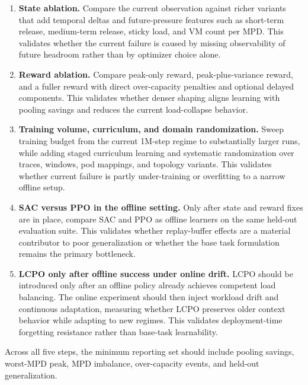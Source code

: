 \documentclass[11pt]{article}
\theoremstyle{definition}
\begin{document}
\begin{enumerate}[leftmargin=*]
    \item \textbf{State ablation.} Compare the current observation against richer
    variants that add temporal deltas and future-pressure features such as
    short-term release, medium-term release, sticky load, and VM count per MPD.
    This validates whether the current failure is caused by missing observability
    of future headroom rather than by optimizer choice alone.

    \item \textbf{Reward ablation.} Compare peak-only reward, peak-plus-variance
    reward, and a fuller reward with direct over-capacity penalties and optional
    delayed components. This validates whether denser shaping aligns learning with
    pooling savings and reduces the current load-collapse behavior.

    \item \textbf{Training volume, curriculum, and domain randomization.} Sweep
    training budget from the current 1M-step regime to substantially larger runs,
    while adding staged curriculum learning and systematic randomization over
    traces, windows, pod mappings, and topology variants. This validates whether
    current failure is partly under-training or overfitting to a narrow offline
    setup.

    \item \textbf{SAC versus PPO in the offline setting.} Only after state and
    reward fixes are in place, compare SAC and PPO \cite{schulman2017ppo} as
    offline learners on the same held-out evaluation suite. This validates
    whether replay-buffer effects are a material contributor to poor
    generalization or whether the base task formulation remains the primary
    bottleneck.

    \item \textbf{LCPO only after offline success under online drift.} LCPO
    \cite{hamadanian2025lcpo} should be introduced only after an offline policy
    already achieves competent load balancing. The online experiment should then
    inject workload drift and continuous adaptation, measuring whether LCPO
    preserves older context behavior while adapting to new regimes. This
    validates deployment-time forgetting resistance rather than base-task
    learnability.
\end{enumerate}

Across all five steps, the minimum reporting set should include pooling savings,
worst-MPD peak, MPD imbalance, over-capacity events, and held-out
generalization.
\end{document}
